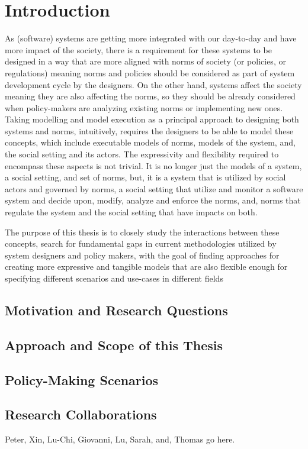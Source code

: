 \chapter{Introduction}


As (software) systems are getting more integrated with our day-to-day and have more impact of the society, there is a requirement for these systems to be designed in a way that are more aligned with norms of society (or policies, or regulations) meaning norms and policies should be considered as part of system development cycle by the designers. On the other hand, systems affect the society meaning they are also affecting the norms, so they should be already considered when policy-makers are analyzing existing norms or implementing new ones. Taking modelling and model execution as a principal approach to designing both systems and norms, intuitively, requires the designers to be able to model these concepts, which include executable models of norms, models of the system, and, the social setting and its actors. The expressivity and flexibility required to encompass these aspects is not trivial. It is no longer just the models of a system, a social setting, and set of norms, but, it is a system that is utilized by social actors and governed by norms, a social setting that utilize and monitor a software system and decide upon, modify, analyze and enforce the norms, and, norms that regulate the system and the social setting that have impacts on both. 


The purpose of this thesis is to closely study the interactions between these concepts, search for fundamental gaps in current methodologies utilized by system designers and policy makers, with the goal of finding approaches for creating more expressive and tangible models that are also flexible enough for specifying different scenarios and use-cases in different fields




\section{Motivation and Research Questions}

\section{Approach and Scope of this Thesis}

\section{Policy-Making Scenarios}

\section{Research Collaborations}
Peter, Xin, Lu-Chi, Giovanni, Lu, Sarah, and, Thomas go here.